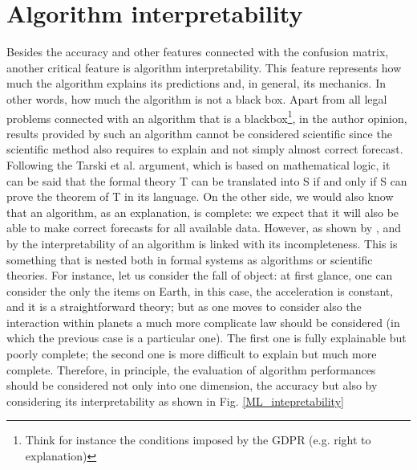 \documentclass[12pt,%
               a4paper,%
               oneside,openany,%
               titlepage,%
               headinclude,footinclude,%
               BCOR5mm,%
               cleardoublepage=empty,%
               tablecaptionabove,%
               floatperchapter,
               ]{scrreprt}                 %
\begin{document}
\section{Algorithm interpretability}

Besides the accuracy and other features connected with the confusion matrix, another critical feature is algorithm interpretability. This feature represents how much the algorithm explains its predictions and, in general, its mechanics. In other words, how much the algorithm is not a black box. Apart from all legal problems connected with an algorithm that is a blackbox\footnote{Think for instance the conditions imposed by the GDPR (e.g. right to explanation)}, in the author opinion, results provided by such an algorithm cannot be considered scientific since the scientific method also requires to explain and not simply almost correct forecast. Following the Tarski et al. \cite{tarski1953undecidable} argument, which is based on mathematical logic, it can be said that the formal theory T can be translated into S if and only if S can prove the theorem of T in its language. On the other side, we would also know that an algorithm, as an explanation, is complete: we expect that it will also be able to make correct forecasts for all available data. However, as shown by \cite{doshi2017towards}, and by \cite{gilpin2018explaining} the interpretability of an algorithm is linked with its incompleteness. This is something that is nested both in formal systems as algorithms or scientific theories. For instance, let us consider the fall of object: at first glance, one can consider the only the items on Earth, in this case, the acceleration is constant, and it is a straightforward theory; but as one moves to consider also the interaction within planets a much more complicate law should be considered (in which the previous case is a particular one). The first one is fully explainable but poorly complete; the second one is more difficult to explain but much more complete. Therefore, in principle, the evaluation of algorithm performances should be considered not only into one dimension, the accuracy but also by considering its interpretability as shown in Fig. \ref{ML_intepretability}
\end{document}
